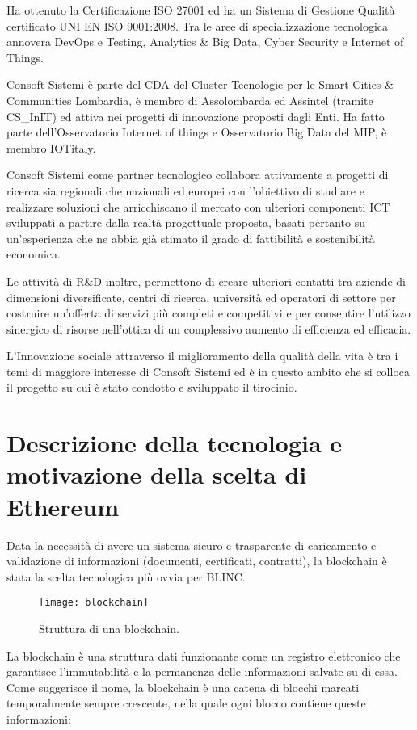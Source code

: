 Ha ottenuto la Certificazione ISO 27001 ed ha un Sistema di Gestione Qualità certificato UNI EN ISO 9001:2008. Tra le aree di specializzazione tecnologica
annovera DevOps e Testing, Analytics \& Big Data, Cyber Security e Internet of Things.

Consoft Sistemi è parte del CDA del Cluster Tecnologie
per le Smart Cities \& Communities Lombardia, è membro di Assolombarda ed Assintel
(tramite CS\_InIT) ed attiva nei progetti di innovazione proposti dagli Enti.
Ha fatto parte dell’Osservatorio Internet of things e Osservatorio Big Data del MIP, è membro IOTitaly.

Consoft Sistemi come partner tecnologico collabora attivamente a progetti di ricerca sia regionali che nazionali ed europei con l’obiettivo di studiare
e realizzare soluzioni che arricchiscano il mercato con ulteriori componenti ICT sviluppati a partire dalla realtà progettuale proposta,
basati pertanto su un'esperienza che ne abbia già stimato il grado di fattibilità e sostenibilità economica.

Le attività di R\&D inoltre, permettono di creare ulteriori contatti tra aziende di dimensioni diversificate, centri di ricerca,
università ed operatori di settore per costruire un’offerta di servizi più completi e competitivi e per consentire l’utilizzo sinergico di risorse
nell'ottica di un complessivo aumento di efficienza ed efficacia.

L’Innovazione sociale attraverso il miglioramento della qualità della vita è tra i temi di maggiore interesse di Consoft Sistemi ed è in questo ambito
che si colloca il progetto su cui è stato condotto e sviluppato il tirocinio.

\section{Descrizione della tecnologia e motivazione della scelta di Ethereum}
Data la necessità di avere un sistema sicuro e trasparente di caricamento e validazione di informazioni (documenti, certificati, contratti),
la blockchain è stata la scelta tecnologica più ovvia per BLINC.

\begin{figure}[h!]
    \texttt{[image: blockchain]}
    \caption{Struttura di una blockchain.}
    \label{fig:blockchain}
\end{figure}

La blockchain è una struttura dati funzionante come un registro elettronico che garantisce l’immutabilità e la permanenza delle informazioni salvate su di essa.
Come suggerisce il nome, la blockchain è una catena di blocchi marcati temporalmente sempre crescente, nella quale ogni blocco contiene queste informazioni:

